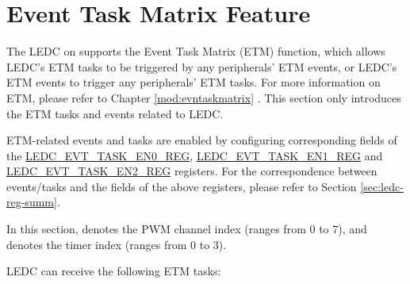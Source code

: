\documentclass[main\_\_EN.tex]{subfiles}
\begin{document}
\section{Event Task Matrix Feature}

The LEDC on \chipname{} supports the Event Task Matrix (ETM) function, which allows LEDC's ETM tasks to be triggered by any peripherals' ETM events, or LEDC's ETM events to trigger any peripherals' ETM tasks. For more information on ETM, please refer to Chapter \ref{mod:evntaskmatrix} . This section only introduces the ETM tasks and events related to LEDC.

ETM-related events and tasks are enabled by configuring corresponding fields of the \hyperref[regdesc:LEDCEVTTASKEN0REG]{LEDC\_EVT\_TASK\_EN0\_REG}, \hyperref[regdesc:LEDCEVTTASKEN1REG]{LEDC\_EVT\_TASK\_EN1\_REG} and \hyperref[regdesc:LEDCEVTTASKEN2REG]{LEDC\_EVT\_TASK\_EN2\_REG} registers. For the correspondence between events/tasks and the fields of the above registers, please refer to Section \ref{sec:ledc-reg-summ}.

In this section,  denotes the PWM channel index (ranges from 0 to 7), and  denotes the timer index (ranges from 0 to 3).

LEDC can receive the following ETM tasks:
\end{document}
